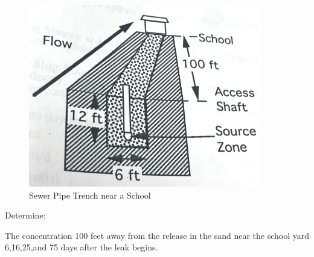 \documentclass[12pt]{article}
\begin{document}
\begin{enumerate}
\begin{figure}[h!] %
\centering
\begin{center}
\includegraphics[width=4in]{schoolyard.png} 
\end{center}
\caption{Sewer Pipe Trench near a School}
\label{fig:schoolyard}
\end{figure}

Determine:

The concentration 100 feet away from the release in the sand near the school yard 6,16,25,and 75 days after the leak begins.  
\clearpage %
~
\clearpage %
\end{enumerate}
\end{document}
